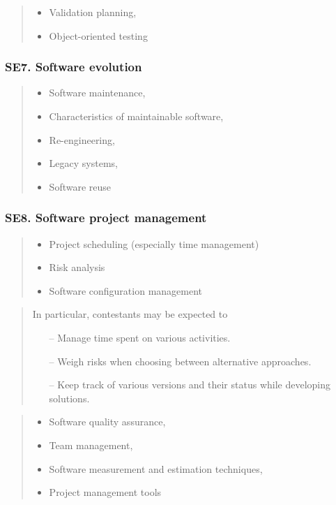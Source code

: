 \documentclass[a4paper,11pt,oneside]{article}
\newcommand{\cmark}{\ding{51}}%
\newcommand{\xmark}{\ding{55}}%
\newcommand{\CC}[1]{#1}
\newcommand{\Ccodeonly}{{\small\cmark\faFileText}}
\newcommand{\Cexcluded}{{\small\xmark}}
\newcommand{\Icodeonly}{\item[\hbox to 1.8em{\Ccodeonly\hfill}]}
\newcommand{\Iexcluded}{\item[\hbox to 1.8em{\Cexcluded\hfill}]}
\newenvironment{myitemize}{\begin{quote}\begin{itemize}\itemsep 0pt}{\end{itemize}\end{quote}}
\begin{document}
        \begin{myitemize}
        \Iexcluded \CC{Validation planning},
        \Iexcluded \CC{Object-oriented testing}
        \end{myitemize}

    \subsubsection*{SE7. Software evolution}
        
        \begin{myitemize}
        \Iexcluded \CC{Software maintenance},
        \Iexcluded \CC{Characteristics of maintainable software},
        \Iexcluded \CC{Re-engineering},
        \Iexcluded \CC{Legacy systems},
        \Iexcluded \CC{Software reuse}
        \end{myitemize}

    \subsubsection*{SE8. Software project management}

        \begin{myitemize}
        \Icodeonly\CC{Project scheduling} (especially time management)
        \Icodeonly\CC{Risk analysis}
        \Icodeonly\CC{Software configuration management}
        \end{myitemize}

        \begin{quote}
        In particular, contestants may be expected to
        \begin{itemize}
        \itemsep -3pt
        \item[--] Manage time spent on various activities.
        \item[--] Weigh risks when choosing between alternative approaches.
        \item[--] Keep track of various versions and their status while developing solutions.
        \end{itemize}
        \end{quote}

        \begin{myitemize}
        \Iexcluded \CC{Software quality assurance},
        \Iexcluded \CC{Team management},
        \Iexcluded \CC{Software measurement and estimation techniques},
        \Iexcluded \CC{Project management tools}
        \end{myitemize}
\end{document}
